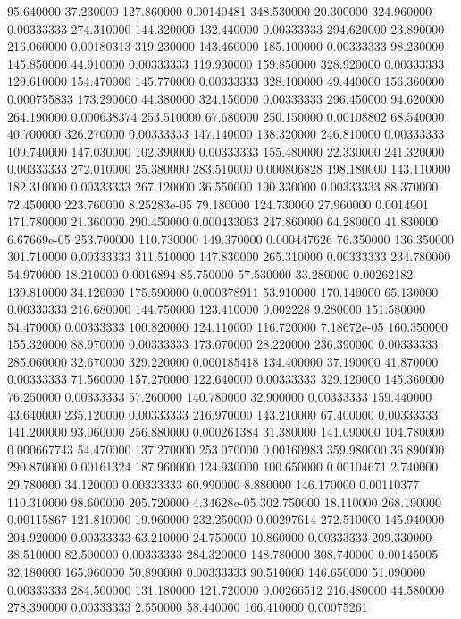 95.640000	37.230000	127.860000	0.00140481
348.530000	20.300000	324.960000	0.00333333
274.310000	144.320000	132.440000	0.00333333
294.620000	23.890000	216.060000	0.00180313
319.230000	143.460000	185.100000	0.00333333
98.230000	145.850000	44.910000	0.00333333
119.930000	159.850000	328.920000	0.00333333
129.610000	154.470000	145.770000	0.00333333
328.100000	49.440000	156.360000	0.000755833
173.290000	44.380000	324.150000	0.00333333
296.450000	94.620000	264.190000	0.000638374
253.510000	67.680000	250.150000	0.00108802
68.540000	40.700000	326.270000	0.00333333
147.140000	138.320000	246.810000	0.00333333
109.740000	147.030000	102.390000	0.00333333
155.480000	22.330000	241.320000	0.00333333
272.010000	25.380000	283.510000	0.000806828
198.180000	143.110000	182.310000	0.00333333
267.120000	36.550000	190.330000	0.00333333
88.370000	72.450000	223.760000	8.25283e-05
79.180000	124.730000	27.960000	0.0014901
171.780000	21.360000	290.450000	0.000433063
247.860000	64.280000	41.830000	6.67669e-05
253.700000	110.730000	149.370000	0.000447626
76.350000	136.350000	301.710000	0.00333333
311.510000	147.830000	265.310000	0.00333333
234.780000	54.970000	18.210000	0.0016894
85.750000	57.530000	33.280000	0.00262182
139.810000	34.120000	175.590000	0.000378911
53.910000	170.140000	65.130000	0.00333333
216.680000	144.750000	123.410000	0.002228
9.280000	151.580000	54.470000	0.00333333
100.820000	124.110000	116.720000	7.18672e-05
160.350000	155.320000	88.970000	0.00333333
173.070000	28.220000	236.390000	0.00333333
285.060000	32.670000	329.220000	0.000185418
134.400000	37.190000	41.870000	0.00333333
71.560000	157.270000	122.640000	0.00333333
329.120000	145.360000	76.250000	0.00333333
57.260000	140.780000	32.900000	0.00333333
159.440000	43.640000	235.120000	0.00333333
216.970000	143.210000	67.400000	0.00333333
141.200000	93.060000	256.880000	0.000261384
31.380000	141.090000	104.780000	0.000667743
54.470000	137.270000	253.070000	0.00160983
359.980000	36.890000	290.870000	0.00161324
187.960000	124.930000	100.650000	0.00104671
2.740000	29.780000	34.120000	0.00333333
60.990000	8.880000	146.170000	0.00110377
110.310000	98.600000	205.720000	4.34628e-05
302.750000	18.110000	268.190000	0.00115867
121.810000	19.960000	232.250000	0.00297614
272.510000	145.940000	204.920000	0.00333333
63.210000	24.750000	10.860000	0.00333333
209.330000	38.510000	82.500000	0.00333333
284.320000	148.780000	308.740000	0.00145005
32.180000	165.960000	50.890000	0.00333333
90.510000	146.650000	51.090000	0.00333333
284.500000	131.180000	121.720000	0.00266512
216.480000	44.580000	278.390000	0.00333333
2.550000	58.440000	166.410000	0.00075261
